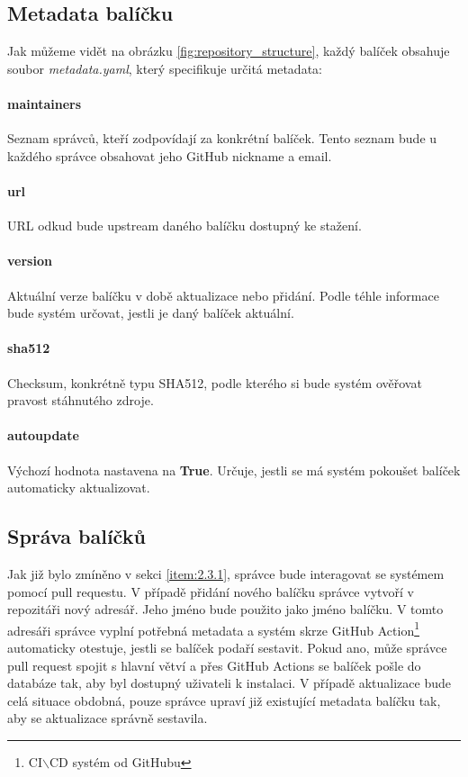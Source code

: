 \documentclass[
  digital,     %
  oneside,     %
  nosansbold,  %
  nocolorbold, %
  lof,         %
  lot,         %
]{fithesis4}
\begin{document}
\subsection{Metadata balíčku}

Jak můžeme vidět na obrázku \ref{fig:repository_structure}, každý
balíček obsahuje soubor \textit{metadata.yaml}, který specifikuje
určitá metadata:

\paragraph{maintainers}
Seznam správců, kteří zodpovídají za konkrétní balíček. Tento seznam
bude u každého správce obsahovat jeho GitHub nickname a email.

\paragraph{url}
URL odkud bude upstream daného balíčku dostupný ke stažení.

\paragraph{version}
Aktuální verze balíčku v době aktualizace nebo přidání. Podle téhle
informace bude systém určovat, jestli je daný balíček aktuální.

\paragraph{sha512}
Checksum, konkrétně typu SHA512, podle kterého si bude systém ověřovat
pravost stáhnutého zdroje.

\paragraph{autoupdate}
Výchozí hodnota nastavena na \textbf{True}. Určuje, jestli se má systém
pokoušet balíček automaticky aktualizovat.


\subsection{Správa balíčků}

Jak již bylo zmíněno v sekci \ref{item:2.3.1}, správce bude interagovat
se systémem pomocí pull requestu. V případě přidání nového balíčku
správce vytvoří v repozitáři nový adresář. Jeho jméno bude použito jako
jméno balíčku. V tomto adresáři správce vyplní potřebná metadata a systém
skrze GitHub Action\footnote{CI$\backslash$CD systém od 
GitHubu\cite{gh_actions}} automaticky otestuje, jestli se balíček podaří
sestavit. Pokud ano, může správce pull request spojit s hlavní větví a 
přes GitHub Actions se balíček pošle do databáze tak, aby byl dostupný 
uživateli k instalaci. V případě aktualizace bude celá situace obdobná,
pouze správce upraví již existující metadata balíčku tak, aby se 
aktualizace správně sestavila.
\end{document}

